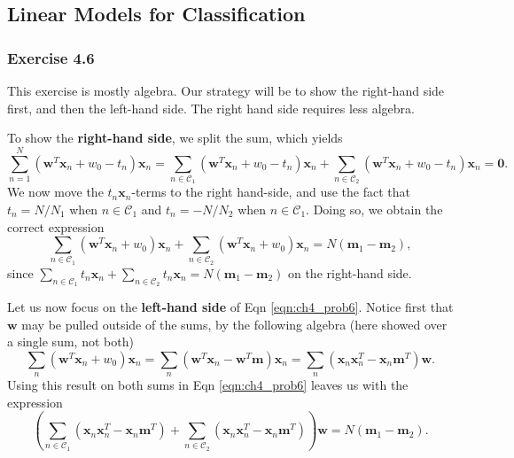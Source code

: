 \documentclass[12pt, a4paper]{article}
\newcommand{\vect}[1]{\bm{#1}}
\begin{document}
\subsection{Linear Models for Classification}

\subsubsection*{Exercise 4.6}
This exercise is mostly algebra.
Our strategy will be to show the right-hand side first, and then the left-hand side.
The right hand side requires less algebra.

To show the \textbf{right-hand side}, we split the sum, which yields
\begin{equation*}
	\sum_{n=1}^{N} \left( \vect{w}^T \vect{x}_n + w_0 - t_n \right) \vect{x}_n
	=
	\sum_{n \in \mathcal{C}_1} \left( \vect{w}^T \vect{x}_n + w_0 - t_n \right) \vect{x}_n
	+
	\sum_{n \in \mathcal{C}_2} \left( \vect{w}^T \vect{x}_n + w_0 - t_n \right) \vect{x}_n
	 = \vect{0}.
\end{equation*}
We now move the $t_n\vect{x}_n$-terms to the right hand-side, and use the fact that $t_n = N / N_1$ when $n \in \mathcal{C}_1$ and $t_n = -N / N_2$ when $n \in \mathcal{C}_1$.
Doing so, we obtain the correct expression
\begin{equation}
\label{eqn:ch4_prob6}
\sum_{n \in \mathcal{C}_1} \left( \vect{w}^T \vect{x}_n + w_0 \right) \vect{x}_n
+
\sum_{n \in \mathcal{C}_2} \left( \vect{w}^T \vect{x}_n + w_0  \right) \vect{x}_n
=
N (\vect{m}_1 - \vect{m}_2),
\end{equation}
since $
\sum_{n \in \mathcal{C}_1}  t_n \vect{x}_n
+
\sum_{n \in \mathcal{C}_2}  t_n \vect{x}_n
= 
N (\vect{m}_1 - \vect{m}_2)
$ on the right-hand side.

Let us now focus on the \textbf{left-hand side} of Eqn \eqref{eqn:ch4_prob6}.
Notice first that $\vect{w}$ may be pulled outside of the sums, by the following algebra (here showed over a single sum, not both)
\begin{equation*}
	\sum_{n} \left( \vect{w}^T \vect{x}_n + w_0 \right) \vect{x}_n
	=
	\sum_{n} \left( \vect{w}^T \vect{x}_n  - \vect{w}^T \vect{m} \right) \vect{x}_n
	=
	\sum_{n} \left( \vect{x}_n \vect{x}_n^T - \vect{x}_n \vect{m}^T \right) \vect{w}.
\end{equation*}
Using this result on both sums in Eqn \eqref{eqn:ch4_prob6} leaves us with the expression
\begin{equation*}
\left( \sum_{n \in \mathcal{C}_1} \left(\vect{x}_n \vect{x}_n^T - \vect{x}_n \vect{m}^T \right) 
+
\sum_{n \in \mathcal{C}_2} \left( \vect{x}_n \vect{x}_n^T - \vect{x}_n \vect{m}^T  \right) \right) \vect{w}
= 
N (\vect{m}_1 - \vect{m}_2).
\end{equation*}
\end{document}

